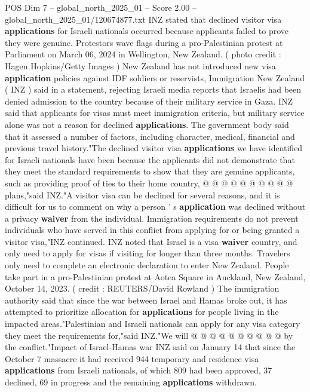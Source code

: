 \begin{textsample}{POS Dim 7 – global\_north\_2025\_01 – Score 2.00 – global\_north\_2025\_01/120674877.txt}  \label{ex:f7_pos_392}
INZ stated that declined visitor visa \textbf{applications} for Israeli nationals occurred because applicants failed to prove they were genuine.
Protestors wave flags during a pro-Palestinian protest at Parliament on March 06, 2024 in Wellington, New Zealand. ( photo credit : Hagen Hopkins/Getty Images ) New Zealand has not introduced new visa \textbf{application} policies against IDF soldiers or reservists, Immigration New Zealand ( INZ ) said in a statement, rejecting Israeli media reports that Israelis had been denied admission to the country because of their military service in Gaza.
INZ said that applicants for visas must meet immigration criteria, but military service alone was not a reason for declined \textbf{applications}.
The government body said that it assessed a number of factors, including character, medical, financial and previous travel history."The declined visitor visa \textbf{applications} we have identified for Israeli nationals have been because the applicants did not demonstrate that they meet the standard requirements to show that they are genuine applicants, such as providing proof of ties to their home country, @ @ @ @ @ @ @ @ @ @ plans,"said INZ."A visitor visa can be declined for several reasons, and it is difficult for us to comment on why a person ' s \textbf{application} was declined without a privacy \textbf{waiver} from the individual.
Immigration requirements do not prevent individuals who have served in this conflict from applying for or being granted a visitor visa,"INZ continued.
INZ noted that Israel is a visa \textbf{waiver} country, and only need to apply for visas if visiting for longer than three months.
Travelers only need to complete an electronic declaration to enter New Zealand.
People take part in a pro-Palestinian protest at Aotea Square in Auckland, New Zealand, October 14, 2023. ( credit : REUTERS/David Rowland ) The immigration authority said that since the war between Israel and Hamas broke out, it has attempted to prioritize allocation for \textbf{applications} for people living in the impacted areas."Palestinian and Israeli nationals can apply for any visa category they meet the requirements for,"said INZ."We will @ @ @ @ @ @ @ @ @ @ by the conflict."Impact of Israel-Hamas war INZ said on January 14 that since the October 7 massacre it had received 944 temporary and residence visa \textbf{applications} from Israeli nationals, of which 809 had been approved, 37 declined, 69 in progress and the remaining \textbf{applications} withdrawn.

\end{textsample}
